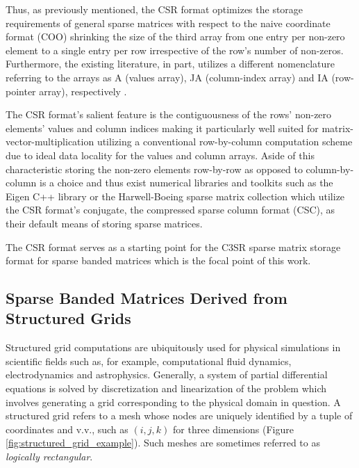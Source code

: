 \documentclass{article}
\begin{document}
    Thus, as previously mentioned, the CSR format optimizes the storage requirements of general sparse matrices with respect to the naive coordinate format (COO) shrinking the size of the third array from one entry per non-zero element to a single entry per row irrespective of the row's number of non-zeros. Furthermore, the existing literature, in part, utilizes a different nomenclature referring to the arrays as A (values array), JA (column-index array) and IA (row-pointer array), respectively \cite{sparskit}.

    The CSR format's salient feature is the contiguousness of the rows' non-zero elements' values and column indices making it particularly well suited for matrix-vector-multiplication utilizing a conventional row-by-column computation scheme due to ideal data locality for the values and column arrays. Aside of this characteristic storing the non-zero elements row-by-row as opposed to column-by-column is a choice and thus exist numerical libraries and toolkits such as the Eigen C++ library \cite{eigen:website} or the Harwell-Boeing sparse matrix collection \cite{harwell-boeing} which utilize the CSR format's conjugate, the compressed sparse column format (CSC), as their default means of storing sparse matrices.

    The CSR format serves as a starting point for the C3SR sparse matrix storage format for sparse banded matrices which is the focal point of this work.

  \subsection{Sparse Banded Matrices Derived from Structured Grids} \label{subsec:structured-grid-matrices}

    Structured grid computations are ubiquitously used for physical simulations in scientific fields such as, for example, computational fluid dynamics, electrodynamics and astrophysics. Generally, a system of partial differential equations is solved by discretization and linearization of the problem which involves generating a grid corresponding to the physical domain in question. A structured grid refers to a mesh whose nodes are uniquely identified by a tuple of coordinates and v.v., such as $(i, j, k)$ for three dimensions (Figure \ref{fig:structured_grid_example}). Such meshes are sometimes referred to as \emph{logically rectangular}.
\end{document}
